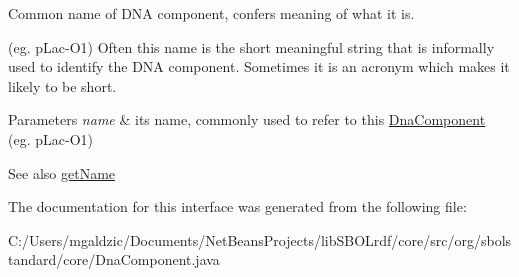 Common name of DNA component, confers meaning of what it is. 

(eg. pLac-\/O1) Often this name is the short meaningful string that is informally used to identify the DNA component. Sometimes it is an acronym which makes it likely to be short. 
\begin{DoxyParams}{Parameters}
{\em name} & its name, commonly used to refer to this \hyperlink{interfaceorg_1_1sbolstandard_1_1core_1_1_dna_component}{DnaComponent} (eg. pLac-\/O1) \\
\hline
\end{DoxyParams}
\begin{DoxySeeAlso}{See also}
\hyperlink{interfaceorg_1_1sbolstandard_1_1core_1_1_dna_component_a78ee178b6a73658d65ca60da4d1e6683}{getName} 
\end{DoxySeeAlso}


The documentation for this interface was generated from the following file:\begin{DoxyCompactItemize}
\item 
C:/Users/mgaldzic/Documents/NetBeansProjects/libSBOLrdf/core/src/org/sbolstandard/core/DnaComponent.java\end{DoxyCompactItemize}
